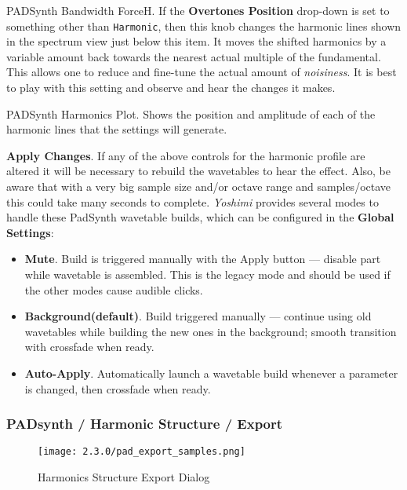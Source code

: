    PADSynth Bandwidth ForceH.
   If the \textbf{Overtones Position} drop-down is set to something other than
   \texttt{Harmonic}, then this knob changes the harmonic lines shown in the
   spectrum view just below this item.
   It moves the shifted harmonics by a variable amount back towards the nearest
   actual multiple of the fundamental. This allows one to reduce and fine-tune the
   actual amount of \textsl{noisiness}.
   It is best to play with this setting and observe and hear the changes it
   makes.

   PADSynth Harmonics Plot.
   Shows the position and amplitude of each of the harmonic lines that the
   settings will generate.

   \textbf{Apply Changes}.
   If any of the above controls for the harmonic profile are altered it will be
   necessary to rebuild the wavetables to hear the effect. Also, be aware that
   with a very big sample size and/or octave range and samples/octave this could
   take many seconds to complete.
   \textsl{Yoshimi} provides several modes to handle these
   PadSynth wavetable builds, which can be configured in the
   \textbf{Global Settings}:

   \begin{itemize}
      \item \textbf{Mute}.
         Build is triggered manually with the Apply button — disable part while
         wavetable is assembled.  This is the legacy mode and should be used if
         the other modes cause audible clicks.
      \item \textbf{Background(default)}.
         Build triggered manually — continue using old wavetables while building
         the new ones in the background; smooth transition with crossfade when
         ready.
      \item \textbf{Auto-Apply}.
         Automatically launch a wavetable build whenever a parameter is changed,
         then crossfade when ready.
   \end{itemize}

\subsubsection{PADsynth / Harmonic Structure / Export}
\label{subsubsec:padsynth_harmonic_structure_export}

\begin{figure}[H]
   \centering
   \texttt{[image: 2.3.0/pad\_export\_samples.png]}
   \caption{Harmonics Structure Export Dialog}
   \label{fig:harmonics_structure_export_dialog}
\end{figure}

